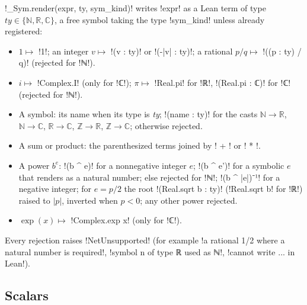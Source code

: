 {\begin{definition}\label{def:lean-export-net-render}
\py!_Sym.render(expr, ty, sym_kind)! writes \py!expr! as a Lean term of type
$\textit{ty}\in\{\mathbb N,\mathbb R,\mathbb C\}$, a free symbol taking the type \py!sym_kind!
unless already registered:
\begin{itemize}
\item $1 \mapsto$ \code!1!; an integer $v \mapsto$ \code!(v : ty)! or \code!(-|v| : ty)!;
  a rational $p/q \mapsto$ \code!((p : ty) / q)! (rejected for \code!ℕ!).
\item $i \mapsto$ \code!Complex.I! (only for \code!ℂ!); $\pi \mapsto$ \code!Real.pi! for
  \leanx!ℝ!, \code!(Real.pi : ℂ)! for \code!ℂ! (rejected for \code!ℕ!).
\item A symbol: its name when its type is \textit{ty}; \code!(name : ty)! for the casts
  $\mathbb N\to\mathbb R$, $\mathbb N\to\mathbb C$, $\mathbb R\to\mathbb C$,
  $\mathbb Z\to\mathbb R$, $\mathbb Z\to\mathbb C$; otherwise rejected.
\item A sum or product: the parenthesized terms joined by \code! + ! or \code! * !.
\item A power $b^e$: \code!(b ^ e)! for a nonnegative integer $e$; \code!(b ^ e')! for a
  symbolic $e$ that renders as a natural number; else rejected for \code!ℕ!;
  \leanx!(b ^ |e|)⁻¹! for a negative integer; for $e = p/2$ the root
  \code!(Real.sqrt b : ty)! (\code!Real.sqrt b! for \leanx!ℝ!) raised to $|p|$, inverted when
  $p<0$; any other power rejected.
\item $\exp(x) \mapsto$ \code!Complex.exp x! (only for \code!ℂ!).
\end{itemize}
Every rejection raises \py!NetUnsupported! (for example
\code!a rational 1/2 where a natural number is required!,
\leanx!symbol n of type ℝ used as ℕ!, \code!cannot write ... in Lean!).
\end{definition}

\subsection{Scalars}\label{sec:lean-export-net-scalars}

}
